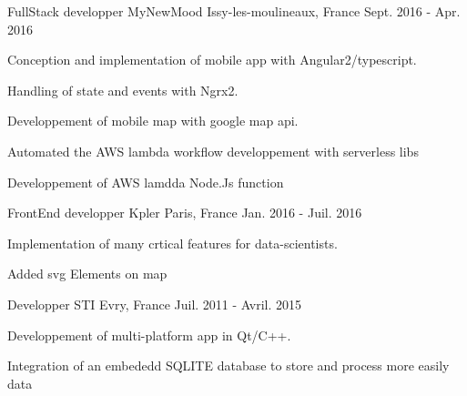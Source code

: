 \begin{cventries}
  \cventry
    {FullStack developper} %
    {MyNewMood} %
    {Issy-les-moulineaux, France} %
    {Sept. 2016 - Apr. 2016} %
    {
      \begin{cvitems} %
        \item {Conception and implementation of mobile app  with Angular2/typescript.}
        \item {Handling of state and events with Ngrx2.}
        \item {Developpement of mobile map with google map api.}
        \item {Automated the AWS lambda workflow developpement with serverless libs}
        \item {Developpement of AWS lamdda Node.Js function}
      \end{cvitems}
    }

  \cventry
    {FrontEnd developper} %
    {Kpler} %
    {Paris, France} %
    {Jan. 2016 - Juil. 2016} %
    {
      \begin{cvitems} %
        \item {Implementation of many crtical features for  data-scientists.}
        \item {Added svg Elements on map}
      \end{cvitems}
    }

  \cventry
    {Developper} %
    {STI} %
    {Evry, France} %
    {Juil. 2011 - Avril. 2015} %
    {
      \begin{cvitems} %
        \item {Developpement of multi-platform app in Qt/C++.}
        \item {Integration of an embededd SQLITE database to store and process more easily data}
      \end{cvitems}
    }
\end{cventries}
